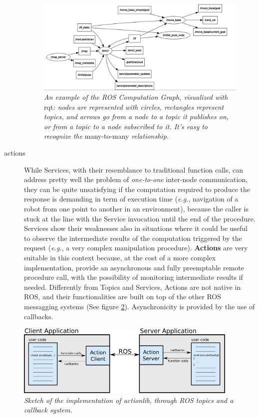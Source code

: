 \begin{description}
\begin{figure}
	\centering
	\includegraphics[width=1.1\textwidth]{Images/background_and_tools/rqt_graph.png}
	\caption{\textit{An example of the \ac{ROS} Computation Graph, visualized with} rqt\textit{: nodes are represented with circles, rectangles represent topics, and arrows go from a node to a topic it publishes on, or from a topic to a node subscribed to it. It's easy to recognize the} many-to-many \textit{relationship.}}
	\label{fig:tfGraph}
\end{figure}

\item[actions] While Services, with their resemblance to traditional function calls, can address pretty well the problem of \textit{one-to-one} inter-node communication, they can be quite unsatisfying if the computation required to produce the response is demanding in term of execution time (\textit{e.g.}, navigation of a robot from one point to another in an environment), because the caller is stuck at the line with the Service invocation until the end of the procedure. Services show their weaknesses also in situations where it could be useful to observe the intermediate results of the computation triggered by the request (\textit{e.g.}, a very complex manipulation procedure). \textbf{Actions} are very suitable in this context because, at the cost of a more complex implementation, provide an asynchronous and fully preemptable remote procedure call, with the possibility of monitoring intermediate results if needed. Differently from Topics and Services, Actions are not native in \ac{ROS}, and their functionalities are built on top of the other \ac{ROS} messagging systems (See figure \ref{fig:actionlib}). Asynchronicity is provided by the use of callbacks.
\end{description}

\begin{figure}
	\centering
	\includegraphics[width=0.95\textwidth]{Images/background_and_tools/actionlib.png}
	\caption{\textit{Sketch of the implementation of actionlib, through \ac{ROS} topics and a callback system.}}
	\label{fig:actionlib}
\end{figure}


